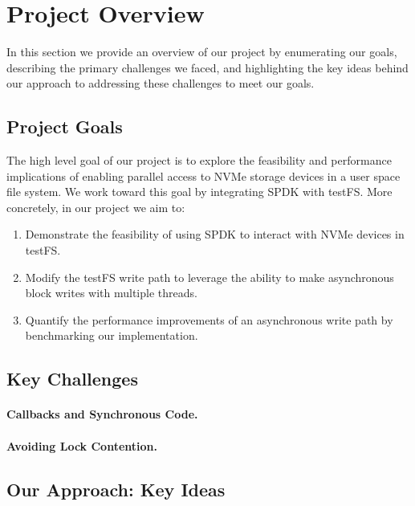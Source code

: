 \section{Project Overview}
In this section we provide an overview of our project by enumerating our goals,
describing the primary challenges we faced, and highlighting the key ideas
behind our approach to addressing these challenges to meet our goals.

\subsection{Project Goals}
The high level goal of our project is to explore the feasibility and
performance implications of enabling parallel access to NVMe storage devices in
a user space file system. We work toward this goal by integrating SPDK with
testFS. More concretely, in our project we aim to:

\begin{enumerate}
  \item Demonstrate the feasibility of using SPDK to interact with NVMe devices
    in testFS.
  \item Modify the testFS write path to leverage the ability to make
    asynchronous block writes with multiple threads.
  \item Quantify the performance improvements of an asynchronous write path by
    benchmarking our implementation.
\end{enumerate}

\subsection{Key Challenges}

\paragraph{Callbacks and Synchronous Code.}

\paragraph{Avoiding Lock Contention.}

\subsection{Our Approach: Key Ideas}
